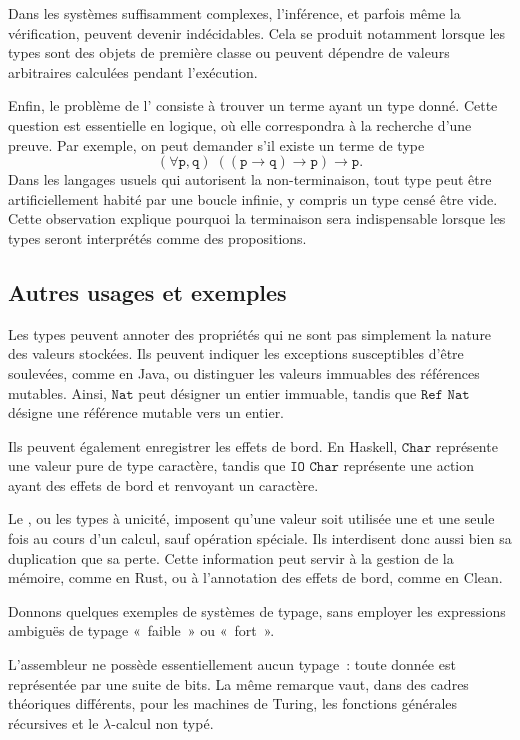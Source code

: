 Dans les systèmes suffisamment complexes, l'inférence, et parfois même
la vérification, peuvent devenir indécidables. Cela se produit
notamment lorsque les types sont des objets de première classe ou
peuvent dépendre de valeurs arbitraires calculées pendant l'exécution.

Enfin, le problème de l' consiste à trouver
un terme ayant un type donné. Cette question est essentielle en
logique, où elle correspondra à la recherche d'une preuve. Par exemple,
on peut demander s'il existe un terme de type
\[
(\forall\mathtt{p},\mathtt{q})\;
((\mathtt{p}\to\mathtt{q})\to\mathtt{p})\to\mathtt{p}.
\]
Dans les langages usuels qui autorisent la non-terminaison, tout type
peut être artificiellement habité par une boucle infinie, y compris un
type censé être vide. Cette observation explique pourquoi la
terminaison sera indispensable lorsque les types seront interprétés
comme des propositions.

\subsection{Autres usages et exemples}

\thingy Les types peuvent annoter des propriétés qui ne sont pas
simplement la nature des valeurs stockées. Ils peuvent indiquer les
exceptions susceptibles d'être soulevées, comme en Java, ou distinguer
les valeurs immuables des références mutables. Ainsi,
$\texttt{Nat}$ peut désigner un entier immuable, tandis que
$\texttt{Ref~Nat}$ désigne une référence mutable vers un entier.

Ils peuvent également enregistrer les effets de bord. En Haskell,
$\texttt{Char}$ représente une valeur pure de type caractère, tandis
que $\texttt{IO~Char}$ représente une action ayant des effets de bord
et renvoyant un caractère.

Le , ou les types à unicité, imposent qu'une
valeur soit utilisée une et une seule fois au cours d'un calcul, sauf
opération spéciale. Ils interdisent donc aussi bien sa duplication que
sa perte. Cette information peut servir à la gestion de la mémoire,
comme en Rust, ou à l'annotation des effets de bord, comme en Clean.

\thingy Donnons quelques exemples de systèmes de typage, sans employer
les expressions ambiguës de typage « faible » ou « fort ».

L'assembleur ne possède essentiellement aucun typage : toute donnée
est représentée par une suite de bits. La même remarque vaut, dans des
cadres théoriques différents, pour les machines de Turing, les
fonctions générales récursives et le $\lambda$-calcul non typé.

